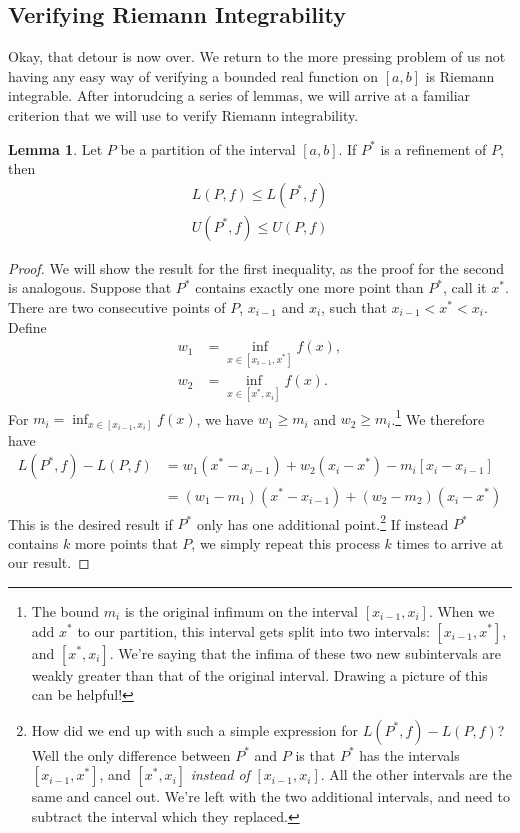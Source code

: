 \documentclass{article}
\theoremstyle{definition}
\newtheorem{lemma}{Lemma}[section]
\begin{document}
\subsection{Verifying Riemann Integrability}
Okay, that detour is now over. We return to the more pressing problem of us not having any easy way of verifying a bounded real function on $ [a,b] $ is Riemann integrable. After intorudcing a series of lemmas, we will arrive at a familiar criterion that we will use to verify Riemann integrability.
\begin{lemma}
	Let $ P $ be a partition of the interval $ [a,b] $. If $ P^* $ is a refinement of $ P $, then\begin{align*}
		L(P,f)\le L(P^*,f)\\
		U(P^*,f)\le U(P,f)
	\end{align*} 
\end{lemma}
\begin{proof}
	We will show the result for the first inequality, as the proof for the second is analogous. Suppose that $ P^* $ contains exactly one more point than $ P^* $, call it $ x^* $. There are two consecutive points of $ P $, $ x_{i-1} $ and $ x_i $, such that $x_{i-1}<x^*<x_i $. Define 
	\begin{align*}
		w_1&=\inf\limits_{x\in[x_{i-1},x^*]}f(x),\\w_2&=\inf\limits_{x\in[x^*,x_i]}f(x).
	\end{align*}
	For $ m_i=\inf_{x\in[x_{i-1},x_i]}f(x) $, we have $ w_1\ge m_i $ and $ w_2\ge m_i $.\footnote{The bound $ m_i $ is the original infimum on the interval $ [x_{i-1},x_i] $. When we add $ x^* $ to our partition, this interval gets split into two intervals: $ [x_{i-1},x^*] $, and $ [x^*,x_i] $. We're saying that the infima of these two new subintervals are weakly greater than that of the original interval. Drawing a picture of this can be helpful!} We therefore have 
	\begin{align*}
		L(P^*,f)-L(P,f)&=w_1(x^*-x_{i-1})+w_2(x_i-x^*)-m_i[x_i-x_{i-1}]\\&=(w_1-m_1)(x^*-x_{i-1})+(w_2-m_2)(x_i-x^*)
	\end{align*}
	This is the desired result if $ P^* $ only has one additional point.\footnote{How did we end up with such a simple expression for $ L(P^*,f)-L(P,f) $? Well the only difference between $ P^* $ and $ P $ is that $ P^* $ has the intervals  $ [x_{i-1},x^*] $, and $ [x^*,x_i] $ \textit{instead of} $ [x_{i-1},x_i]  $. All the other intervals are the same and cancel out. We're left with the two additional intervals, and need to subtract the interval which they replaced.} If instead $ P^* $ contains $ k $ more points that $ P $, we simply repeat this process $ k $ times to arrive at our result.  
\end{proof}
\end{document}
